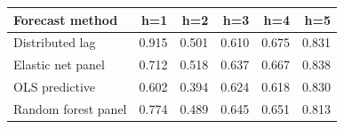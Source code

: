 \begin{tabular}{lrrrrr}
\toprule
Forecast method & h=1 & h=2 & h=3 & h=4 & h=5 \\
\midrule
Distributed lag & 0.915 & 0.501 & 0.610 & 0.675 & 0.831 \\
Elastic net panel & 0.712 & 0.518 & 0.637 & 0.667 & 0.838 \\
OLS predictive & 0.602 & 0.394 & 0.624 & 0.618 & 0.830 \\
Random forest panel & 0.774 & 0.489 & 0.645 & 0.651 & 0.813 \\
\bottomrule
\end{tabular}
